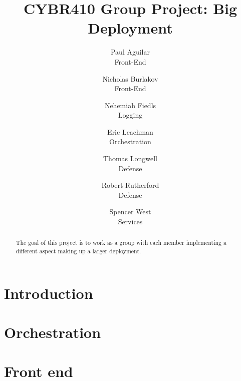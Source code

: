 \documentclass[letterpaper,twocolumn,10pt]{article}
\begin{document}

\date{}

\title{\Large \bf CYBR410 Group Project: Big Deployment}

\author{
  {\rm Paul Aguilar}\\
  Front-End
  \and
  {\rm Nicholas Burlakov}\\
  Front-End
  \and
  {\rm Nehemiah Fiedls}\\
  Logging
  \and
  {\rm Eric Leachman}\\
  Orchestration
  \and
  {\rm Thomas Longwell}\\
  Defense
  \and
  {\rm Robert Rutherford}\\
  Defense
  \and
  {\rm Spencer West}\\
  Services
}

\maketitle

\begin{abstract}
The goal of this project is to work as a group with each member implementing a different aspect making up a larger deployment. 
\end{abstract}


\section{Introduction}


\section{Orchestration}


\section{Front end}
\end{document}
